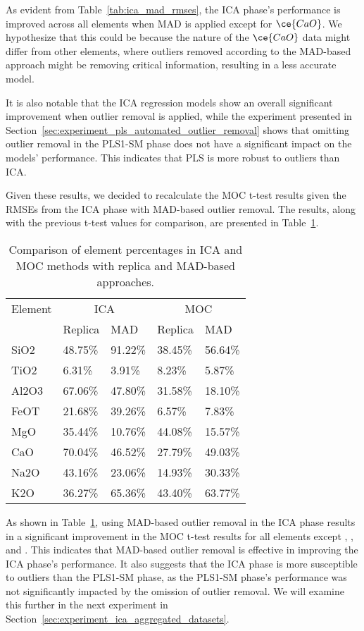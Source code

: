 As evident from Table~\ref{tab:ica_mad_rmses}, the ICA phase's performance is improved across all elements when MAD is applied except for $\ce{CaO}$.
We hypothesize that this could be because the nature of the $\ce{CaO}$ data might differ from other elements, where outliers removed according to the MAD-based approach might be removing critical information, resulting in a less accurate model.

It is also notable that the ICA regression models show an overall significant improvement when outlier removal is applied, while the experiment presented in Section~\ref{sec:experiment_pls_automated_outlier_removal} shows that omitting outlier removal in the PLS1-SM phase does not have a significant impact on the models' performance.
This indicates that PLS is more robust to outliers than ICA.

Given these results, we decided to recalculate the MOC t-test results given the RMSEs from the ICA phase with MAD-based outlier removal.
The results, along with the previous t-test values for comparison, are presented in Table~\ref{tab:ica_mad_moc_ttest_results}.
\begin{table}[h]
\centering
\begin{tabular}{lllll}
\hline
Element & \multicolumn{2}{c}{ICA} & \multicolumn{2}{c}{MOC} \\
& Replica & MAD & Replica & MAD \\
\hline
SiO2 & 48.75\% & 91.22\% & 38.45\% & 56.64\% \\
TiO2 & 6.31\% & 3.91\% & 8.23\% & 5.87\% \\
Al2O3 & 67.06\% & 47.80\% & 31.58\% & 18.10\% \\
FeOT & 21.68\% & 39.26\% & 6.57\% & 7.83\% \\
MgO & 35.44\% & 10.76\% & 44.08\% & 15.57\% \\
CaO & 70.04\% & 46.52\% & 27.79\% & 49.03\% \\
Na2O & 43.16\% & 23.06\% & 14.93\% & 30.33\% \\
K2O & 36.27\% & 65.36\% & 43.40\% & 63.77\% \\
\hline
\end{tabular}
\caption{Comparison of element percentages in ICA and MOC methods with replica and MAD-based approaches.}
\label{tab:ica_mad_moc_ttest_results}
\end{table}

As shown in Table~\ref{tab:ica_mad_moc_ttest_results}, using MAD-based outlier removal in the ICA phase results in a significant improvement in the MOC t-test results for all elements except , , and . 
This indicates that MAD-based outlier removal is effective in improving the ICA phase's performance.
It also suggests that the ICA phase is more susceptible to outliers than the PLS1-SM phase, as the PLS1-SM phase's performance was not significantly impacted by the omission of outlier removal.
We will examine this further in the next experiment in Section~\ref{sec:experiment_ica_aggregated_datasets}.
